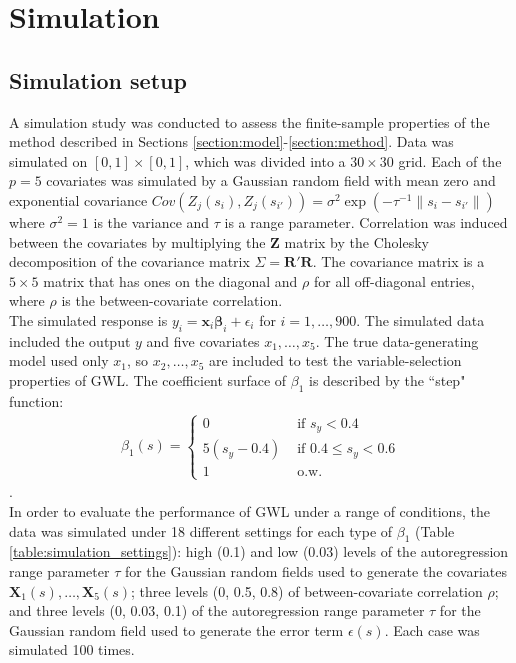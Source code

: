 \documentclass[authoryear, review, 11pt]{elsarticle}
\begin{document}
\section{Simulation}
	\subsection{Simulation setup}
	A simulation study was conducted to assess the finite-sample properties of the method described in Sections \ref{section:model}-\ref{section:method}. Data was simulated on $[0,1] \times [0,1]$, which was divided into a $30 \times 30$ grid. Each of the $p=5$ covariates was simulated by a Gaussian random field with mean zero and exponential covariance $Cov \left(Z_j(s_i), Z_j(s_{i'}) \right) = \sigma^2 \exp{\left( -\tau^{-1} \|s_i - s_{i'} \| \right)}$ where $\sigma^2=1$ is the variance and $\tau$ is a range parameter. Correlation was induced between the covariates by multiplying the $\bm{Z}$ matrix by the Cholesky decomposition of the covariance matrix $\Sigma = \bm{R}'\bm{R}$. The covariance matrix is a $5 \times 5$ matrix that has ones on the diagonal and $\rho$ for all off-diagonal entries, where $\rho$ is the between-covariate correlation.\\
		
	The simulated response is $y_i = \bm{x}_i \bm{\beta}_i + \epsilon_i$ for $i=1, \dots, 900$. The simulated data included the output $y$ and five covariates $x_1, \dots, x_5$. The true data-generating model used only $x_1$, so $x_2, \dots, x_5$ are included to test the variable-selection properties of GWL. The coefficient surface of $\beta_1$ is described by the ``step" function:
	\begin{eqnarray}
		\beta_1(s) = \begin{cases} 0 &\mbox{ if } s_y<0.4 \\ 5(s_y-0.4) &\mbox{ if } 0.4 \leq s_y<0.6 \\ 1 &\mbox{ o.w.} \end{cases}
	\end{eqnarray}.\\
		
	In order to evaluate the performance of GWL under a range of conditions, the data was simulated under 18 different settings for each type of $\beta_1$ (Table \ref{table:simulation_settings}): high (0.1) and low (0.03) levels of the autoregression range parameter $\tau$ for the Gaussian random fields used to generate the covariates $\bm{X}_1(s), \dots, \bm{X}_5(s)$; three levels (0, 0.5, 0.8) of between-covariate correlation $\rho$; and three levels (0, 0.03, 0.1) of the autoregression range parameter $\tau$ for the Gaussian random field used to generate the error term $\epsilon(s)$. Each case was simulated 100 times.\\
	
\end{document}
